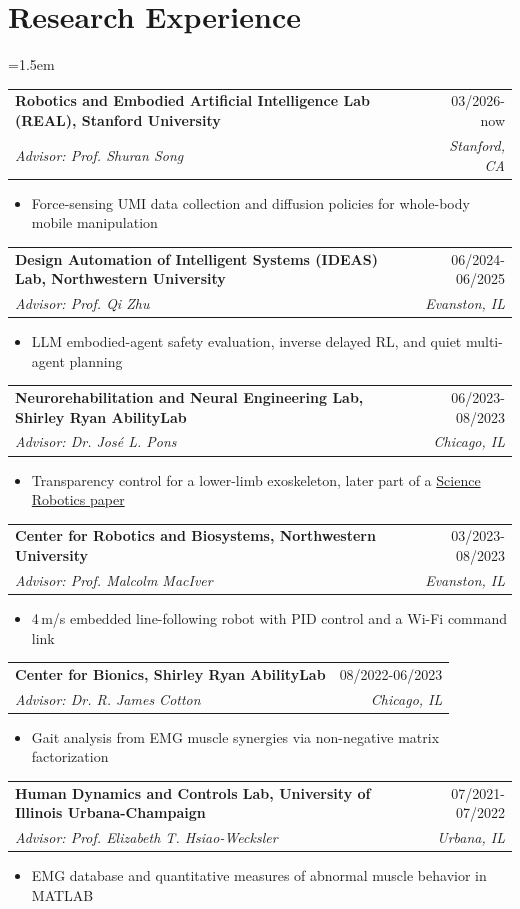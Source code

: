 \documentclass[10pt,letterpaper]{article}
\makeatletter
\newenvironment{block}{\begin{list}{}{\leftmargin=1.5em\rightmargin=0pt\itemsep=0pt\topsep=0pt}\item[]}{\end{list}}
\newenvironment{bullets}{\begin{itemize}[label=$\cdot$,leftmargin=0.9em,itemsep=0pt,parsep=0pt,topsep=-0.3em]}{\end{itemize}\vspace{0.55em}}
\newcommand{\entry}[4]{%
  \begin{tabularx}{\linewidth}{@{}>{\raggedright\arraybackslash}X r@{}}
    \textbf{#1} & #2 \\
    \textit{#3} & \textit{#4}
  \end{tabularx}\par\vspace{0.3em}}
\makeatother
\begin{document}
\section{Research Experience}
\begin{block}
\entry{Robotics and Embodied Artificial Intelligence Lab (REAL), Stanford University}{03/2026-now}{Advisor: Prof. Shuran Song}{Stanford, CA}
\begin{bullets}
  \item Force-sensing UMI data collection and diffusion policies for whole-body mobile manipulation
\end{bullets}
\entry{Design Automation of Intelligent Systems (IDEAS) Lab, Northwestern University}{06/2024-06/2025}{Advisor: Prof. Qi Zhu}{Evanston, IL}
\begin{bullets}
  \item LLM embodied-agent safety evaluation, inverse delayed RL, and quiet multi-agent planning
\end{bullets}
\entry{Neurorehabilitation and Neural Engineering Lab, Shirley Ryan AbilityLab}{06/2023-08/2023}{Advisor: Dr. Jos\'e L. Pons}{Chicago, IL}
\begin{bullets}
  \item Transparency control for a lower-limb exoskeleton, later part of a \href{https://www.science.org/doi/10.1126/scirobotics.adz9628}{Science Robotics paper}
\end{bullets}
\entry{Center for Robotics and Biosystems, Northwestern University}{03/2023-08/2023}{Advisor: Prof. Malcolm MacIver}{Evanston, IL}
\begin{bullets}
  \item 4\,m/s embedded line-following robot with PID control and a Wi-Fi command link
\end{bullets}
\entry{Center for Bionics, Shirley Ryan AbilityLab}{08/2022-06/2023}{Advisor: Dr. R. James Cotton}{Chicago, IL}
\begin{bullets}
  \item Gait analysis from EMG muscle synergies via non-negative matrix factorization
\end{bullets}
\entry{Human Dynamics and Controls Lab, University of Illinois Urbana-Champaign}{07/2021-07/2022}{Advisor: Prof. Elizabeth T. Hsiao-Wecksler}{Urbana, IL}
\begin{bullets}
  \item EMG database and quantitative measures of abnormal muscle behavior in MATLAB
\end{bullets}
\end{block}
\end{document}
